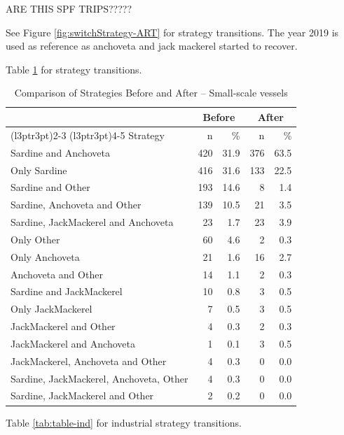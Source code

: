 \documentclass[
  11pt,
]{article}
\begin{document}
ARE THIS SPF TRIPS?????

See Figure \ref{fig:switchStrategy-ART} for strategy transitions. The
year 2019 is used as reference as anchoveta and jack mackerel started to
recover.

Table \ref{tab:table-art} for strategy transitions.

\begin{table}
\centering
\caption{\label{tab:table-art}Comparison of Strategies Before and After -- Small-scale vessels}
\centering
\fontsize{10}{12}\selectfont
\begin{tabular}[t]{lrrrr}
\toprule
\multicolumn{1}{c}{ } & \multicolumn{2}{c}{Before} & \multicolumn{2}{c}{After} \\
\cmidrule(l{3pt}r{3pt}){2-3} \cmidrule(l{3pt}r{3pt}){4-5}
Strategy & n & \% & n & \%\\
\midrule
Sardine and Anchoveta & 420 & 31.9 & 376 & 63.5\\
Only Sardine & 416 & 31.6 & 133 & 22.5\\
Sardine and Other & 193 & 14.6 & 8 & 1.4\\
Sardine, Anchoveta and Other & 139 & 10.5 & 21 & 3.5\\
Sardine, JackMackerel and Anchoveta & 23 & 1.7 & 23 & 3.9\\
\addlinespace
Only Other & 60 & 4.6 & 2 & 0.3\\
Only Anchoveta & 21 & 1.6 & 16 & 2.7\\
Anchoveta and Other & 14 & 1.1 & 2 & 0.3\\
Sardine and JackMackerel & 10 & 0.8 & 3 & 0.5\\
Only JackMackerel & 7 & 0.5 & 3 & 0.5\\
\addlinespace
JackMackerel and Other & 4 & 0.3 & 2 & 0.3\\
JackMackerel and Anchoveta & 1 & 0.1 & 3 & 0.5\\
JackMackerel, Anchoveta and Other & 4 & 0.3 & 0 & 0.0\\
Sardine, JackMackerel, Anchoveta, Other & 4 & 0.3 & 0 & 0.0\\
Sardine, JackMackerel and Other & 2 & 0.2 & 0 & 0.0\\
\bottomrule
\end{tabular}
\end{table}

Table \ref{tab:table-ind} for industrial strategy transitions.
\end{document}
